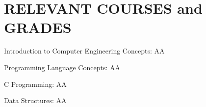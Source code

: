 \section{RELEVANT COURSES and GRADES}

\begin{itemize}[itemsep=0pt, parsep=5pt]
  \begin{minipage}{0.55\linewidth}
      \item Introduction to Computer Engineering Concepts: AA
      \item Programming Language Concepts: AA
  \end{minipage}
  \begin{minipage}{0.4\linewidth}
      \item C Programming: AA
      \item Data Structures: AA
  \end{minipage}
\end{itemize}
